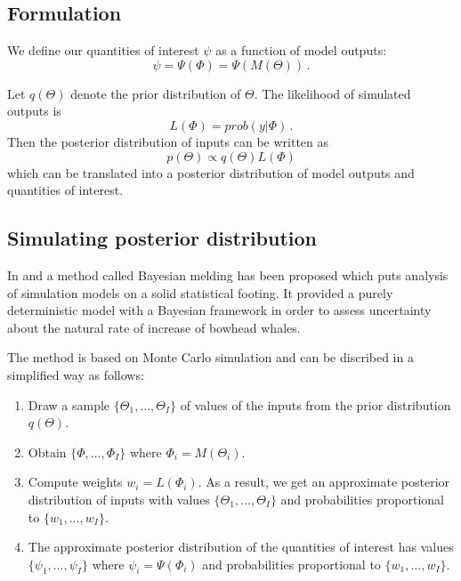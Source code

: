 \documentclass[11pt, fleqn]{article}
\begin{document}
\begin{figure}
\begin{center}

\caption{\label{fig:BM}\small }
\end{center}
\end{figure}

\subsection{Formulation}
%
We define our quantities of interest $\psi$ as a function of model
outputs: 
\[
\psi = \Psi(\Phi) = \Psi(M(\Theta))\,.
\]

Let $q(\Theta)$ denote the prior distribution of $\Theta$.  The likelihood of
simulated outputs is 
\begin{equation}
\label{eq:likelihood}
L(\Phi) = prob(y | \Phi)\,.
\end{equation}
Then the posterior
distribution of inputs can be written as
\[
p(\Theta) \propto q(\Theta)L(\Phi)
\]
which can be translated into a posterior distribution of model outputs and
quantities of interest.

\subsection{Simulating posterior distribution}
\label{sec:simupost}

In \citet{raftery95} and \citet{poole00} a method called Bayesian
melding has been proposed which puts analysis of simulation models on a solid
statistical footing. It provided a purely deterministic model with a Bayesian
framework in order to assess uncertainty about the natural rate of increase of
bowhead whales. 

The method is based on Monte Carlo simulation and can be discribed in a
simplified way as follows:
\begin{enumerate}
\item Draw a sample $\{\Theta_1,\dots,\Theta_I\}$ of values of the inputs from
  the prior distribution $q(\Theta)$.
\item  Obtain $\{\Phi,\dots,\Phi_I\}$ where
  $\Phi_i = M(\Theta_i)$. 
\item Compute weights $w_i = L(\Phi_i)$. As a result, we get an approximate
  posterior distribution of inputs with values $\{\Theta_1,\dots,\Theta_I\}$
  and probabilities proportional to $\{w_1,\dots,w_I\}$. 
\item The approximate posterior distribution of the quantities of interest has
  values $\{\psi_1,\dots,\psi_I\}$ where $\psi_i=\Psi(\Phi_i)$ and
  probabilities proportional to $\{w_1,\dots,w_I\}$.
\end{enumerate}
\end{document}
